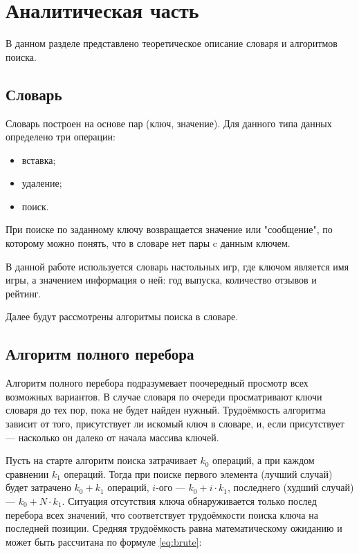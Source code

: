 \chapter{Аналитическая часть}

В данном разделе представлено теоретическое описание словаря и алгоритмов
поиска.

\section{Словарь}

Словарь построен на основе пар (ключ, значение). Для данного типа данных
определено три операции:
\begin{itemize}
    \item вставка;
    \item удаление;
    \item поиск.
\end{itemize}

При поиске по заданному ключу возвращается значение или "сообщение"{}, по
которому можно понять, что в словаре нет пары c данным ключем.

В данной работе используется словарь настольных игр, где ключом является
имя игры, а значением информация о ней: год выпуска, количество отзывов и
рейтинг.

Далее будут рассмотрены алгоритмы поиска в словаре.

\section{Алгоритм полного перебора}

Алгоритм полного перебора \cite{McConnel} подразумевает поочередный просмотр
всех возможных вариантов. В случае словаря по очереди просматривают ключи
словаря до тех пор, пока не будет найден нужный. Трудоёмкость алгоритма зависит
от того, присутствует ли искомый ключ в словаре, и, если присутствует ---
насколько он далеко от начала массива ключей.

Пусть на старте алгоритм поиска затрачивает $k_0$ операций, а при каждом
сравнении $k_1$ операций. Тогда при поиске первого элемента (лучший случай)
будет затрачено $k_0 + k_1$ операций, $i$-ого --- $k_0 +
i \cdot k_1$, последнего (худший случай) --- $k_0 + N \cdot k_1$. Ситуация
отсутствия ключа обнаруживается только послед перебора всех значений, что 
соответствует трудоёмкости поиска ключа на последней позиции.
Средняя трудоёмкость равна математическому ожиданию и может быть
рассчитана по формуле \ref{eq:brute}:

